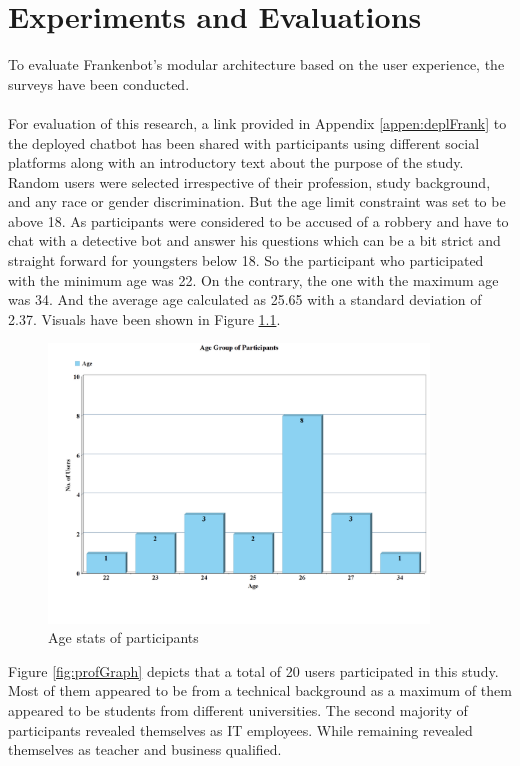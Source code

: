 \chapter{Experiments and Evaluations\label{cha:chapter4}}

To evaluate Frankenbot's modular architecture based on the user experience, the surveys have been conducted. 
\\~\\
For evaluation of this research, a link provided in Appendix \ref{appen:deplFrank} to the deployed chatbot has been shared with participants using different social platforms along with an introductory text about the purpose of the study. Random users were selected irrespective of their profession, study background, and any race or gender discrimination. But the age limit constraint was set to be above 18. As participants were considered to be accused of a robbery and have to chat with a detective bot and answer his questions which can be a bit strict and straight forward for youngsters below 18. So the participant who participated with the minimum age was 22. On the contrary, the one with the maximum age was 34. And the average age calculated as 25.65 with a standard deviation of 2.37. Visuals have been shown in Figure \ref{fig:ageGraph}.

\begin{figure}[!h]
    \centering
    \includegraphics[width=0.9\textwidth]{img/Age_Graph_Updated_2.PNG}
    \caption{Age stats of participants}
    \label{fig:ageGraph}
\end{figure}

\noindent
Figure \ref{fig:profGraph} depicts that a total of 20 users participated in this study. Most of them appeared to be from a technical background as a maximum of them appeared to be students from different universities. The second majority of participants revealed themselves as IT employees. While remaining revealed themselves as teacher and business qualified.

